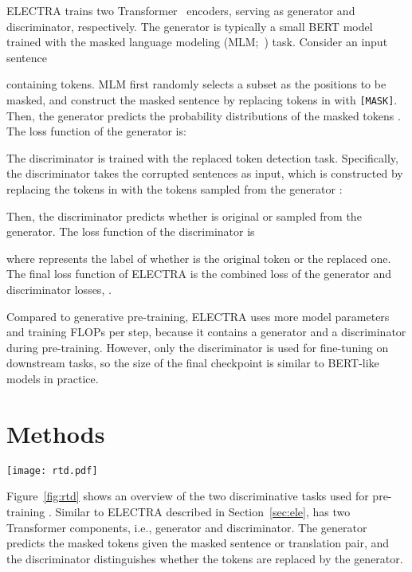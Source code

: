 \documentclass[11pt]{article}
\newcommand\our{\makebox{\textsc{XLM-E}}}
\newcommand\ele{\textsc{ELECTRA}}
\begin{document}
\ele{} trains two Transformer~\cite{transformer} encoders, serving as generator and discriminator, respectively.
The generator  is typically a small BERT model trained with the masked language modeling (MLM;~\citealt{bert}) task. Consider an input sentence

containing  tokens. MLM first randomly selects a subset  as the positions to be masked, and construct the masked sentence  by replacing tokens in  with \texttt{[MASK]}.
Then, the generator predicts the probability distributions of the masked tokens . The loss function of the generator  is:

The discriminator  is trained with the replaced token detection task. Specifically, the discriminator takes the corrupted sentences  as input, which is constructed by replacing the tokens in  with the tokens sampled from the generator :

Then, the discriminator predicts whether  is original or sampled from the generator. The loss function of the discriminator  is

where  represents the label of whether  is the original token or the replaced one.
The final loss function of \ele{} is the combined loss of the generator and discriminator losses, .

Compared to generative pre-training, ELECTRA uses more model parameters and training FLOPs per step, because it contains a generator and a discriminator during pre-training.
However, only the discriminator is used for fine-tuning on downstream tasks, so the size of the final checkpoint is similar to BERT-like models in practice.


\section{Methods}
\label{sec:methods}

\begin{figure*}[t]
\centering
\texttt{[image: rtd.pdf]}
\caption{Overview of two pre-training tasks of \our{}, i.e., multilingual replaced token detection, and translation replaced token detection. The generator predicts the masked tokens given a masked sentence or a masked translation pair, and the discriminator distinguishes whether the tokens are replaced by the generator.}
\label{fig:rtd}
\end{figure*}

Figure~\ref{fig:rtd} shows an overview of the two discriminative tasks used for pre-training \our{}.
Similar to \ele{} described in Section~\ref{sec:ele}, \our{} has two Transformer components, i.e., generator and discriminator. The generator predicts the masked tokens given the masked sentence or translation pair, and the discriminator distinguishes whether the tokens are replaced by the generator.
\end{document}
